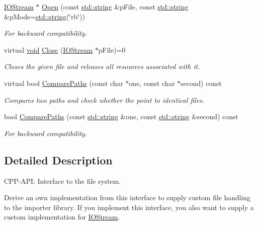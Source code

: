 \begin{DoxyCompactItemize}
\hyperlink{class_assimp_1_1_i_o_stream}{I\-O\-Stream} $\ast$ \hyperlink{class_assimp_1_1_i_o_system_aef35fabc9bd49fb83bfd4f12a94083c3}{Open} (const \hyperlink{glew_8h_ae84541b4f3d8e1ea24ec0f466a8c568b}{std\-::string} \&p\-File, const \hyperlink{glew_8h_ae84541b4f3d8e1ea24ec0f466a8c568b}{std\-::string} \&p\-Mode=\hyperlink{glew_8h_ae84541b4f3d8e1ea24ec0f466a8c568b}{std\-::string}(\char`\"{}rb\char`\"{}))
\begin{DoxyCompactList}\small\item\em For backward compatibility. \end{DoxyCompactList}\item 
virtual \hyperlink{wglew_8h_aeea6e3dfae3acf232096f57d2d57f084}{void} \hyperlink{class_assimp_1_1_i_o_system_a8c334d60f04bceeb6bd0157d21723f3e}{Close} (\hyperlink{class_assimp_1_1_i_o_stream}{I\-O\-Stream} $\ast$p\-File)=0
\begin{DoxyCompactList}\small\item\em Closes the given file and releases all resources associated with it. \end{DoxyCompactList}\item 
virtual bool \hyperlink{class_assimp_1_1_i_o_system_a11349a65b353ed62f655c3dd802b9062}{Compare\-Paths} (const char $\ast$one, const char $\ast$second) const 
\begin{DoxyCompactList}\small\item\em Compares two paths and check whether the point to identical files. \end{DoxyCompactList}\item 
bool \hyperlink{class_assimp_1_1_i_o_system_a279d1d4b0b2aa37800e222aad508dff1}{Compare\-Paths} (const \hyperlink{glew_8h_ae84541b4f3d8e1ea24ec0f466a8c568b}{std\-::string} \&one, const \hyperlink{glew_8h_ae84541b4f3d8e1ea24ec0f466a8c568b}{std\-::string} \&second) const 
\begin{DoxyCompactList}\small\item\em For backward compatibility. \end{DoxyCompactList}\end{DoxyCompactItemize}


\subsection{Detailed Description}
C\-P\-P-\/\-A\-P\-I\-: Interface to the file system. 

Derive an own implementation from this interface to supply custom file handling to the importer library. If you implement this interface, you also want to supply a custom implementation for \hyperlink{class_assimp_1_1_i_o_stream}{I\-O\-Stream}.

